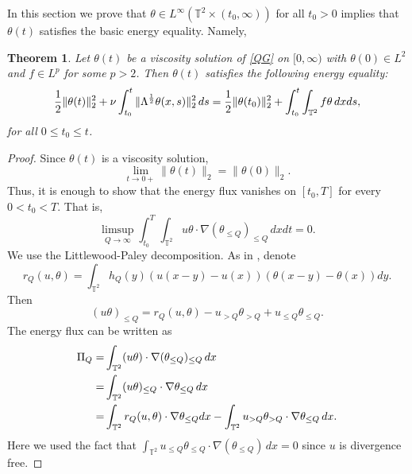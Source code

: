 \documentclass{amsart}
\newtheorem {Theorem}  {Theorem}
\numberwithin{Theorem}{section}
\theoremstyle{definition}
\theoremstyle{remark}
\renewcommand{\th}{\theta}
\begin{document}
In this section we prove that $\theta\in L^\infty(\mathbb T^2 \times (t_0,\infty))$ for all $t_0>0$ implies that $\th(t)$ satisfies the basic energy equality. Namely,
\begin{Theorem}\label{basic-energy}
Let $\theta(t)$ be a viscosity solution of \eqref{QG} on $[0,\infty)$ with $\th(0) \in L^2$ and $f \in L^{p}$ for some $p>2$. Then $\th(t)$ satisfies the following energy equality:
\begin{equation}\notag
\frac{1}{2}\|\theta(t)\|_2^2+\nu\int_{t_0}^{t}\|\Lambda^{\frac{1}{2}}\theta(x,s)\|_2^2\,ds= 
\frac{1}{2}\|\theta(t_0)\|_2^2+\int_{t_0}^{t}\int_{\mathbb T^2}f\theta \, dxds,
\end{equation}
for all $0\leq t_0 \leq t$.
\end{Theorem}
\begin{proof}
Since $\th(t)$ is a viscosity solution,
\[
\lim_{t \to 0+} \|\th(t)\|_2 = \|\th(0)\|_2.
\]
Thus, it is enough to show that the energy flux vanishes on $[t_0,T]$ for every $0<t_0<T$. That is,
\[
\limsup_{Q \to \infty} \int_{t_0}^T\int_{\mathbb T^2}u\th \cdot\nabla (\theta_{\leq Q})_{\leq Q} \, dxdt=0.
\]
We use the Littlewood-Paley decomposition. As in \cite{CCFS},
denote 
\[r_Q(u,\theta)=\int_{\mathbb T^2}h_Q(y)\left(u(x-y)-u(x)\right) \left(\theta(x-y)-\theta(x)\right)dy.\]
Then 
\[(u\theta)_{\leq Q}=r_Q(u,\theta)-u_{>Q}\theta_{>Q}+u_{\leq Q}\theta_{\leq Q}.\]
The energy flux can be written as 
\begin{equation}\notag
\begin{split}
\Pi_Q=&\int_{\mathbb T^2}(u\theta)\cdot \nabla(\theta_{\leq Q})_{\leq Q}\,dx\\
=&\int_{\mathbb T^2}(u\theta)_{\leq Q}\cdot\nabla\theta_{\leq Q}\,dx\\
=&\int_{\mathbb T^2}r_Q(u,\theta)\cdot \nabla\theta_{\leq Q}dx
-\int_{\mathbb T^2}u_{>Q}\theta_{>Q}\cdot \nabla\theta_{\leq Q}\,dx.
\end{split}
\end{equation}
Here we used the fact that $\int_{\mathbb T^2}u_{\leq Q}\theta_{\leq Q}\cdot \nabla(\theta_{\leq Q})\,dx=0$ since $u$ is divergence free.


\end{proof}
\end{document}
